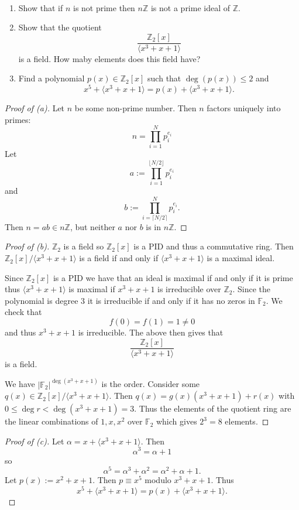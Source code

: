 \begin{prob}[3, Exam 2019]
    \
    \begin{enumerate}[label=\alph*)]
        \item Show that if $n$ is not prime then $n\mathbb Z$ is 
            not a prime ideal of $\mathbb Z$. 
        \item Show that the quotient 
            \[
                \frac{\mathbb Z_2[x]}{\langle x^3 + x + 1\rangle}
            \]
            is a field. How maby elements does this field have? 
        \item Find a polynomial $p(x) \in \mathbb Z_2[x]$ such 
            that $\deg(p(x)) \leq 2 $ and 
            \[
                x^5 + \langle x^3 + x + 1\rangle = 
                p(x) + \langle x^3 + x + 1\rangle.
            \]
    \end{enumerate}
\end{prob}
\begin{proof}[Proof of (a)]
    Let $n$ be some non-prime number. 
    Then $n$ factors uniquely into primes: 
    \[
        n = \prod_{i = 1}^N p_i^{e_i}   
    \]
    Let 
    \[
        a := \prod_{i=1}^{\lfloor N/2 \rfloor} p_i^{e_i}
    \]
    and 
    \[
        b := \prod_{i=\lceil N/2 \rceil}^N p_i^{e_i}.
    \]
    Then $n = ab \in n \mathbb Z$, but 
    neither $a$ nor $b$ is in $n\mathbb Z$. 
\end{proof}
\begin{proof}[Proof of (b)]
    $\mathbb Z_2$ is a field so $\mathbb Z_2[x]$ is a PID and 
    thus a commutative ring. Then $\mathbb Z_2[x]/\langle 
    x^3 + x + 1 \rangle$ is a field if and only if 
    $\langle x^3 + x +1\rangle$ is a maximal ideal. 

    Since $\mathbb Z_2[x]$ is a PID we have that an ideal 
    is maximal if and only if it is prime thus $\langle x^3 + x + 
    1\rangle$ is maximal if $x^3 + x + 1$ is irreducible over 
    $\mathbb Z_2$. Since the polynomial is degree $3$ it is  
    irreducible if and only if it has no zeros in $\mathbb F_2$. 
    We check that 
    \[
        f(0) = f(1) = 1 \neq 0
    \]
    and thus $x^3 + x + 1$ is irreducible. The above then gives 
    that 
    \[
        \frac{\mathbb Z_2[x]}{\langle x^3 + x + 1\rangle}
    \]
    is a field. 

    We have $|\mathbb F_2|^{\deg(x^3 + x + 1)}$ is the order. 
    Consider some $q(x) \in \mathbb Z_2[x]/\langle x^3 + x + 1  
    \rangle$. Then $q(x) = g(x)(x^3 + x + 1) + r(x)$ with 
    $0 \leq \deg r < \deg(x^3 + x + 1) = 3$. Thus 
    the elements of the quotient ring are the linear 
    combinations of $1,x,x^2$ over $\mathbb F_2$ which gives 
    $2^3 = 8$ elements. 
\end{proof}
\begin{proof}[Proof of (c)]
    Let $\alpha = x + \langle x^3 + x + 1\rangle$. Then 
    \[
        \alpha^3 = \alpha + 1
    \]
    so 
    \[
        \alpha^5 = \alpha^3 + \alpha^2 = 
        \alpha^2 + \alpha + 1. 
    \]
    Let $p(x) := x^2 + x + 1$. Then $p \equiv x^5$ modulo 
    $x^3 + x + 1$. 
    Thus 
    \[
        x^5 + \langle x^3 + x + 1 \rangle 
        = p(x) + \langle x^3 + x + 1 \rangle. 
    \]
\end{proof}

